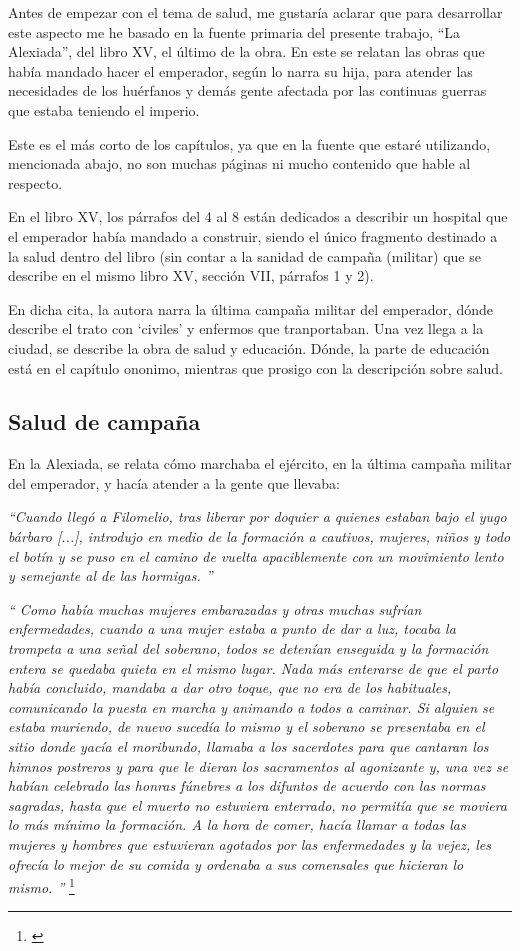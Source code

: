 
Antes de empezar con el tema de salud, me gustaría aclarar que
para desarrollar este aspecto me he basado en
la fuente primaria del 
presente trabajo, “La Alexiada”, del libro XV, el último de la obra. 
En este se relatan
las obras que había mandado hacer el emperador, 
según lo narra su hija, para atender las necesidades de
los huérfanos y demás gente afectada 
por las continuas guerras que estaba teniendo el imperio.

Este es el más corto de los capítulos, ya que en la fuente
que estaré utilizando, mencionada abajo, no son muchas
páginas ni mucho contenido que hable al respecto.

En el libro XV, los párrafos del 4 al 8 están dedicados a 
describir un hospital que el emperador había mandado a construir, 
siendo el único fragmento destinado a la salud dentro del libro 
(sin contar a la sanidad de campaña (militar) que se describe 
en el mismo libro XV, sección VII, párrafos 1 y 2).

En dicha cita, la autora narra la última campaña militar
del emperador, dónde describe el trato con `civiles' y
enfermos que tranportaban. Una vez llega a la ciudad,
se describe la obra de salud y educación.
Dónde, la parte de educación está en el capítulo ononimo,
mientras que prosigo con la descripción sobre salud.

\subsection{Salud de campaña}
En la Alexiada, se relata cómo marchaba el ejército, en la
última campaña militar del emperador, y hacía atender
a la gente que llevaba:

\textit{``Cuando llegó a Filomelio, tras liberar por doquier
	a quienes estaban bajo el yugo bárbaro [...], introdujo
	en medio de la formación a cautivos, mujeres, niños y
	todo el botín y se puso en el camino de vuelta apaciblemente
	con un movimiento lento y semejante al de las hormigas.
	''}

\textit{``
	Como había muchas mujeres embarazadas y otras muchas sufrían
	enfermedades, cuando a una mujer estaba a punto de dar a luz,
	tocaba la trompeta a una señal del soberano, todos se detenían
	enseguida y la formación entera se quedaba quieta en el mismo
	lugar. Nada más enterarse de que el parto había concluido,
	mandaba a dar otro toque, que no era de los habituales,
	comunicando la puesta en marcha y animando a todos a caminar.
	Si alguien se estaba muriendo, de nuevo sucedía lo mismo y el
	soberano se presentaba en el sitio donde yacía el moribundo,
	llamaba a los sacerdotes para que cantaran los himnos postreros
	y para que le dieran los sacramentos al agonizante y, una vez se
	habían celebrado las honras fúnebres a los difuntos de acuerdo
	con las normas sagradas, hasta que el muerto no estuviera enterrado,
	no permitía que se moviera lo más mínimo la formación. A la hora de comer,
	hacía llamar a todas las mujeres y hombres que estuvieran agotados
	por las enfermedades y la vejez, les ofrecía lo mejor de su comida
	y ordenaba a sus comensales que hicieran lo mismo.
	''}
\footnote{\cite[pp.~604--605]{alexiadaXV}}

